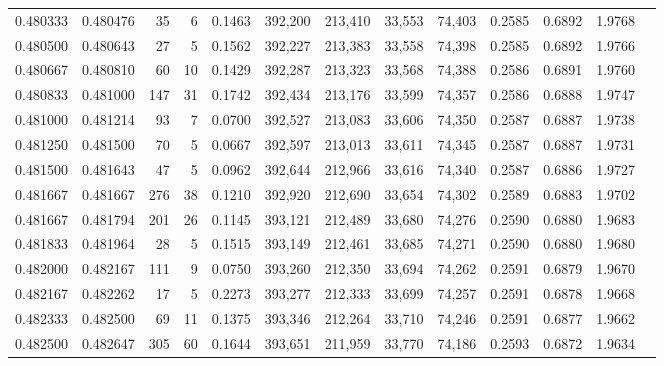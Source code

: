 \begin{tabular}{rrrrrrrrrrrrr}
0.480333 & 0.480476 &    35 &   6 &                                     0.1463 & 392,200 & 213,410 &  33,553 &  74,403 & 0.2585 & 0.6892 & 1.9768 \\
0.480500 & 0.480643 &    27 &   5 &                                     0.1562 & 392,227 & 213,383 &  33,558 &  74,398 & 0.2585 & 0.6892 & 1.9766 \\
0.480667 & 0.480810 &    60 &  10 &                                     0.1429 & 392,287 & 213,323 &  33,568 &  74,388 & 0.2586 & 0.6891 & 1.9760 \\
0.480833 & 0.481000 &   147 &  31 &                                     0.1742 & 392,434 & 213,176 &  33,599 &  74,357 & 0.2586 & 0.6888 & 1.9747 \\
0.481000 & 0.481214 &    93 &   7 &                                     0.0700 & 392,527 & 213,083 &  33,606 &  74,350 & 0.2587 & 0.6887 & 1.9738 \\
0.481250 & 0.481500 &    70 &   5 &                                     0.0667 & 392,597 & 213,013 &  33,611 &  74,345 & 0.2587 & 0.6887 & 1.9731 \\
0.481500 & 0.481643 &    47 &   5 &                                     0.0962 & 392,644 & 212,966 &  33,616 &  74,340 & 0.2587 & 0.6886 & 1.9727 \\
0.481667 & 0.481667 &   276 &  38 &                                     0.1210 & 392,920 & 212,690 &  33,654 &  74,302 & 0.2589 & 0.6883 & 1.9702 \\
0.481667 & 0.481794 &   201 &  26 &                                     0.1145 & 393,121 & 212,489 &  33,680 &  74,276 & 0.2590 & 0.6880 & 1.9683 \\
0.481833 & 0.481964 &    28 &   5 &                                     0.1515 & 393,149 & 212,461 &  33,685 &  74,271 & 0.2590 & 0.6880 & 1.9680 \\
0.482000 & 0.482167 &   111 &   9 &                                     0.0750 & 393,260 & 212,350 &  33,694 &  74,262 & 0.2591 & 0.6879 & 1.9670 \\
0.482167 & 0.482262 &    17 &   5 &                                     0.2273 & 393,277 & 212,333 &  33,699 &  74,257 & 0.2591 & 0.6878 & 1.9668 \\
0.482333 & 0.482500 &    69 &  11 &                                     0.1375 & 393,346 & 212,264 &  33,710 &  74,246 & 0.2591 & 0.6877 & 1.9662 \\
0.482500 & 0.482647 &   305 &  60 &                                     0.1644 & 393,651 & 211,959 &  33,770 &  74,186 & 0.2593 & 0.6872 & 1.9634 \\

\end{tabular}
